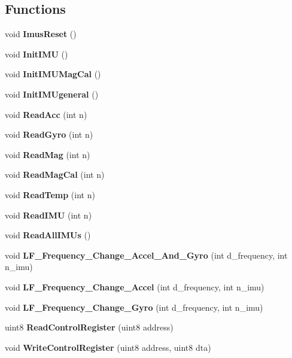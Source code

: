\subsection*{Functions}
\begin{DoxyCompactItemize}
\item 
\mbox{\label{_i_m_u__functions_8h_a950a5a57e4188823c580d054ed2db16a}} 
void {\bfseries Imus\+Reset} ()
\item 
\mbox{\label{_i_m_u__functions_8h_ac4f81f61837e6a132dfceb5bb93b06fa}} 
void {\bfseries Init\+I\+MU} ()
\item 
\mbox{\label{_i_m_u__functions_8h_ac95975151b543b5265bc1e470aabf465}} 
void {\bfseries Init\+I\+M\+U\+Mag\+Cal} ()
\item 
\mbox{\label{_i_m_u__functions_8h_a83f0630cb5ff556322c8cf56b6c6afc0}} 
void {\bfseries Init\+I\+M\+Ugeneral} ()
\item 
\mbox{\label{_i_m_u__functions_8h_a0290185f5b71ddb96ea13ce0a1ff48e7}} 
void {\bfseries Read\+Acc} (int n)
\item 
\mbox{\label{_i_m_u__functions_8h_ab8ae2a28912ce4a548b3603e86b22ae9}} 
void {\bfseries Read\+Gyro} (int n)
\item 
\mbox{\label{_i_m_u__functions_8h_a2ee29250f51422fa3d76df77335cce26}} 
void {\bfseries Read\+Mag} (int n)
\item 
\mbox{\label{_i_m_u__functions_8h_aad3b4856a76c623025484fe5b931bdd4}} 
void {\bfseries Read\+Mag\+Cal} (int n)
\item 
\mbox{\label{_i_m_u__functions_8h_ab0883cd12ebf2937fd6da478ac3ab976}} 
void {\bfseries Read\+Temp} (int n)
\item 
\mbox{\label{_i_m_u__functions_8h_a45df9ddb73de250cebfa02bf1d72bd97}} 
void {\bfseries Read\+I\+MU} (int n)
\item 
\mbox{\label{_i_m_u__functions_8h_a27bf3026dfe4cb0d6d255decc9944d71}} 
void {\bfseries Read\+All\+I\+M\+Us} ()
\item 
\mbox{\label{_i_m_u__functions_8h_aedf370e8317a01e05be04c137b24c663}} 
void {\bfseries L\+F\+\_\+\+Frequency\+\_\+\+Change\+\_\+\+Accel\+\_\+\+And\+\_\+\+Gyro} (int d\+\_\+frequency, int n\+\_\+imu)
\item 
\mbox{\label{_i_m_u__functions_8h_abb751a71b7e833c6026896dbbcaf2559}} 
void {\bfseries L\+F\+\_\+\+Frequency\+\_\+\+Change\+\_\+\+Accel} (int d\+\_\+frequency, int n\+\_\+imu)
\item 
\mbox{\label{_i_m_u__functions_8h_aa59b6641f60e4cbcf11ddd98a31c7d4c}} 
void {\bfseries L\+F\+\_\+\+Frequency\+\_\+\+Change\+\_\+\+Gyro} (int d\+\_\+frequency, int n\+\_\+imu)
\item 
\mbox{\label{_i_m_u__functions_8h_a209b21711f8765bb41e1823aab7b995b}} 
uint8 {\bfseries Read\+Control\+Register} (uint8 address)
\item 
\mbox{\label{_i_m_u__functions_8h_af429837786eebd63058e26b3c86ac17a}} 
void \textbf{ Write\+Control\+Register} (uint8 address, uint8 dta)
\begin{DoxyCompactList}\small\item\em 


\end{DoxyCompactList}
\end{DoxyCompactItemize}
